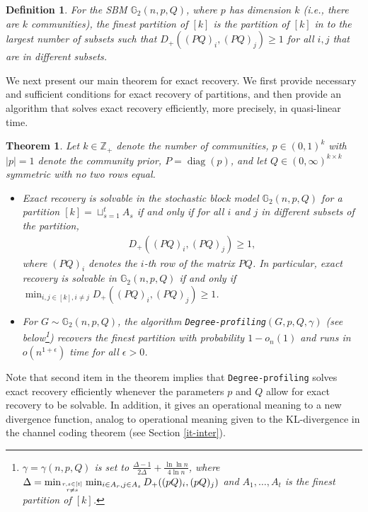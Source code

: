 \documentclass[11pt]{article}
\newcommand{\gs}{\mathbb{G}_2}
\newcommand{\dd}{D_+}
\newcommand{\mZ}{\mathbb{Z}}
\DeclareMathOperator{\diag}{diag}
\newcommand{\1}{\mathbb{1}}
\newtheorem{theorem}{Theorem}
\newtheorem{definition}{Definition}
\begin{document}
\begin{definition}
For the SBM $\gs(n,p,Q)$, where $p$ has dimension $k$ (i.e., there are $k$ communities), the finest partition of $[k]$ is the partition of $[k]$ in to the largest number of subsets such that $\dd((PQ)_i,(PQ)_j) \geq 1$ for all $i,j$ that are in different subsets.
\end{definition}

We next present our main theorem for exact recovery. We first provide necessary and sufficient conditions for exact recovery of partitions, and then provide an algorithm that solves exact recovery efficiently, more precisely, in quasi-linear time. 

\begin{theorem}\label{thm2}
Let $k \in \mZ_+$ denote the number of communities, $p \in (0,1)^k$ with $|p|=1$ denote the community prior, $P=\diag(p)$, and let $Q \in (0,\infty)^{k \times k}$ symmetric with no two rows equal.
\begin{itemize}
\item Exact recovery is solvable in the stochastic block model $\gs(n,p,Q)$ for a partition $[k] = \sqcup_{s=1}^t A_s$ if and only if for all $i$ and $j$ in different subsets of the partition,
\begin{align}
\dd ((PQ)_i , (PQ)_j) \geq 1, \label{d1}
\end{align}
where $(PQ)_i$ denotes the $i$-th row of the matrix $PQ$. In particular, exact recovery is solvable in $\gs(n,p,Q)$ if and only if $\min_{i,j \in [k], i \neq j} \dd ((PQ)_i , (PQ)_j) \geq 1$.
\item For $G \sim \gs(n,p,Q)$, the algorithm {\tt Degree-profiling}$(G,p,Q,\gamma)$ (see below\footnote{$\gamma=\gamma(n,p,Q)$ is set to $\frac{\Delta -1}{2\Delta} +\frac{\ln\ln n}{4 \ln n}$, where $\Delta = \min_{r,s \in [t] \atop{r \neq s}} \min_{ i \in A_r, j \in A_s}  \dd((pQ)_i, (pQ)_j)$ and $A_1,\dots,A_t$ is the finest partition of $[k]$.}) recovers the finest partition with probability $1-o_n(1)$ and runs in $o(n^{1+\epsilon})$ time for all $\epsilon>0$. 
\end{itemize} 
\end{theorem}
Note that second item in the theorem implies that {\tt Degree-profiling} solves exact recovery efficiently whenever the parameters $p$ and $Q$ allow for exact recovery to be solvable. In addition, it gives an operational meaning to a new divergence function, analog to operational meaning given to the KL-divergence in the channel coding theorem (see Section \ref{it-inter}).
\end{document}
